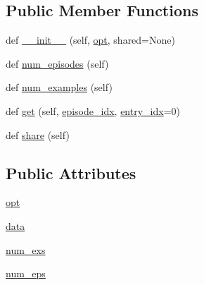 \subsection*{Public Member Functions}
\begin{DoxyCompactItemize}
\item 
def \hyperlink{classparlai_1_1tasks_1_1dailydialog_1_1agents_1_1Convai2Teacher_a8dede379600bb9f0e942059ea2b0d9f0}{\+\_\+\+\_\+init\+\_\+\+\_\+} (self, \hyperlink{classparlai_1_1tasks_1_1dailydialog_1_1agents_1_1Convai2Teacher_a371a92d402235c804fcfc06d57272e1d}{opt}, shared=None)
\item 
def \hyperlink{classparlai_1_1tasks_1_1dailydialog_1_1agents_1_1Convai2Teacher_a2e260f4477f6fd9ec11a1a1663e32bef}{num\+\_\+episodes} (self)
\item 
def \hyperlink{classparlai_1_1tasks_1_1dailydialog_1_1agents_1_1Convai2Teacher_a6060e79bfc569e66d1c36af19522ed79}{num\+\_\+examples} (self)
\item 
def \hyperlink{classparlai_1_1tasks_1_1dailydialog_1_1agents_1_1Convai2Teacher_a1d6018e0044b71bc4ceb789e302d66a4}{get} (self, \hyperlink{classparlai_1_1core_1_1teachers_1_1FixedDialogTeacher_afd4ebab8063eb42d182d30a1a41f133e}{episode\+\_\+idx}, \hyperlink{classparlai_1_1core_1_1teachers_1_1FixedDialogTeacher_ae3201b15f3c3b46a2f3511bad9b43e7d}{entry\+\_\+idx}=0)
\item 
def \hyperlink{classparlai_1_1tasks_1_1dailydialog_1_1agents_1_1Convai2Teacher_ae9ac20bbc572a14bcd71f33fb8887599}{share} (self)
\end{DoxyCompactItemize}
\subsection*{Public Attributes}
\begin{DoxyCompactItemize}
\item 
\hyperlink{classparlai_1_1tasks_1_1dailydialog_1_1agents_1_1Convai2Teacher_a371a92d402235c804fcfc06d57272e1d}{opt}
\item 
\hyperlink{classparlai_1_1tasks_1_1dailydialog_1_1agents_1_1Convai2Teacher_ac7cf75fc10464ec7a06d118b8e8fe216}{data}
\item 
\hyperlink{classparlai_1_1tasks_1_1dailydialog_1_1agents_1_1Convai2Teacher_a067edc53b57e9157e32e740952ad4d79}{num\+\_\+exs}
\item 
\hyperlink{classparlai_1_1tasks_1_1dailydialog_1_1agents_1_1Convai2Teacher_a67499af89d747fa0efeae42d133e52c1}{num\+\_\+eps}
\end{DoxyCompactItemize}

